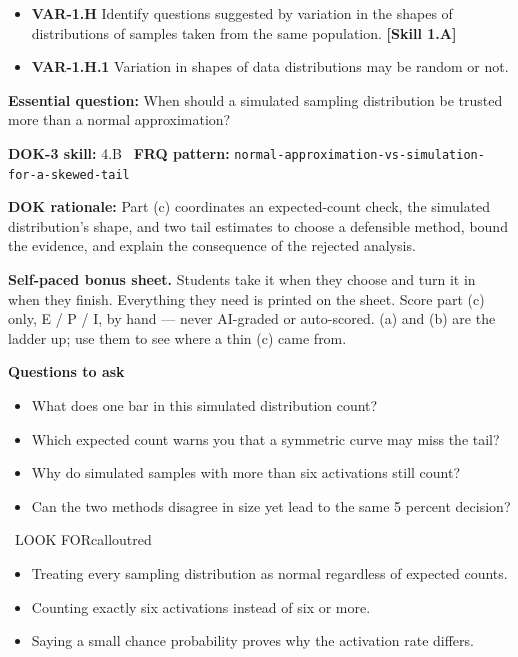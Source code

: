 \documentclass[11pt]{article}
\begin{document}


{\small
\begin{itemize}[leftmargin=1.5em,itemsep=2pt,topsep=2pt]
  \item \textbf{VAR-1.H} Identify questions suggested by variation in the shapes of distributions of samples taken from the same population. \textbf{[Skill 1.A]}
  \item \textbf{VAR-1.H.1} Variation in shapes of data distributions may be random or not.
\end{itemize}
}
\textbf{Essential question:} When should a simulated sampling distribution be trusted more than a normal approximation?\par
\textbf{DOK-3 skill:} 4.B \textperiodcentered\ \textbf{FRQ pattern:} {\small\texttt{normal-\allowbreak{}approximation-\allowbreak{}vs-\allowbreak{}simulation-\allowbreak{}for-\allowbreak{}a-\allowbreak{}skewed-\allowbreak{}tail}}\par
\textbf{DOK rationale:} Part (c) coordinates an expected-count check, the simulated distribution's shape, and two tail estimates to choose a defensible method, bound the evidence, and explain the consequence of the rejected analysis.\par

\textbf{Self-paced bonus sheet.} Students take it when they choose and turn it in when they finish. Everything they need is printed on the sheet. Score part (c) only, E / P / I, by hand --- never AI-graded or auto-scored. (a) and (b) are the ladder up; use them to see where a thin (c) came from.\par

\textbf{Questions to ask}
\begin{itemize}[leftmargin=1.5em,itemsep=2pt,topsep=2pt]
  \item What does one bar in this simulated distribution count?
  \item Which expected count warns you that a symmetric curve may miss the tail?
  \item Why do simulated samples with more than six activations still count?
  \item Can the two methods disagree in size yet lead to the same 5 percent decision?
\end{itemize}

\begin{callout}{\IconWarn\ LOOK FOR}{calloutred}
\begin{itemize}[leftmargin=1.5em,itemsep=2pt,topsep=2pt]
  \item Treating every sampling distribution as normal regardless of expected counts.
  \item Counting exactly six activations instead of six or more.
  \item Saying a small chance probability proves why the activation rate differs.
\end{itemize}
\end{callout}
\end{document}
